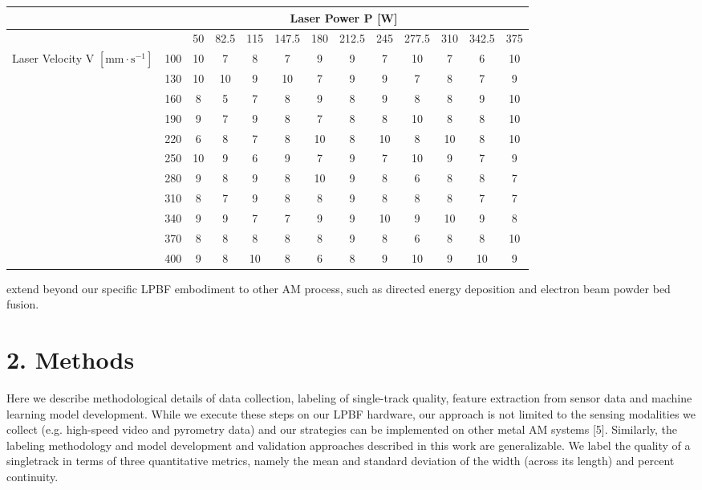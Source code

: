 \documentclass[10pt]{article}
\begin{document}
\begin{center}
\begin{tabular}{|c|c|c|c|c|c|c|c|c|c|c|c|c|}
\hline
 & \multicolumn{12}{|c|}{Laser Power P [W]} \\
\hline
 &  & 50 & 82.5 & 115 & 147.5 & 180 & 212.5 & 245 & 277.5 & 310 & 342.5 & 375 \\
\hline
\multirow[t]{11}{*}{Laser Velocity V $\left[\mathrm{mm} \cdot \mathrm{s}^{-1}\right]$} & 100 & 10 & 7 & 8 & 7 & 9 & 9 & 7 & 10 & 7 & 6 & 10 \\
\hline
 & 130 & 10 & 10 & 9 & 10 & 7 & 9 & 9 & 7 & 8 & 7 & 9 \\
\hline
 & 160 & 8 & 5 & 7 & 8 & 9 & 8 & 9 & 8 & 8 & 9 & 10 \\
\hline
 & 190 & 9 & 7 & 9 & 8 & 7 & 8 & 8 & 10 & 8 & 8 & 10 \\
\hline
 & 220 & 6 & 8 & 7 & 8 & 10 & 8 & 10 & 8 & 10 & 8 & 10 \\
\hline
 & 250 & 10 & 9 & 6 & 9 & 7 & 9 & 7 & 10 & 9 & 7 & 9 \\
\hline
 & 280 & 9 & 8 & 9 & 8 & 10 & 9 & 8 & 6 & 8 & 8 & 7 \\
\hline
 & 310 & 8 & 7 & 9 & 8 & 8 & 9 & 8 & 8 & 8 & 7 & 7 \\
\hline
 & 340 & 9 & 9 & 7 & 7 & 9 & 9 & 10 & 9 & 10 & 9 & 8 \\
\hline
 & 370 & 8 & 8 & 8 & 8 & 8 & 9 & 8 & 6 & 8 & 8 & 10 \\
\hline
 & 400 & 9 & 8 & 10 & 8 & 6 & 8 & 9 & 10 & 9 & 10 & 9 \\
\hline
\end{tabular}
\end{center}

extend beyond our specific LPBF embodiment to other AM process, such as directed energy deposition and electron beam powder bed fusion.

\section*{2. Methods}
Here we describe methodological details of data collection, labeling of single-track quality, feature extraction from sensor data and machine learning model development. While we execute these steps on our LPBF hardware, our approach is not limited to the sensing modalities we collect (e.g. high-speed video and pyrometry data) and our strategies can be implemented on other metal AM systems [5]. Similarly, the labeling methodology and model development and validation approaches described in this work are generalizable. We label the quality of a singletrack in terms of three quantitative metrics, namely the mean and standard deviation of the width (across its length) and percent continuity.
\end{document}
